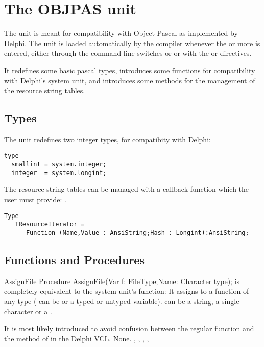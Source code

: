 \chapter{The OBJPAS unit}
The  unit is meant for compatibility with Object Pascal as
implemented by Delphi. The unit is loaded automatically by the \fpc compiler
whenever the  or  more is entered, either through
the command line switches  or  or with the  or  directives.

It redefines some basic pascal types, introduces some functions for
compatibility with Delphi's system unit, and introduces some methods for the
management of the resource string tables.

\section{Types}
The  unit redefines two integer types, for compatibity with
Delphi:
\begin{verbatim}
type
  smallint = system.integer;
  integer  = system.longint;
\end{verbatim}
The resource string tables can be managed with a callback function which the
user must provide: .
\begin{verbatim}
Type
   TResourceIterator =
      Function (Name,Value : AnsiString;Hash : Longint):AnsiString;
\end{verbatim}

\section{Functions and Procedures}

\begin{procedure}{AssignFile}
\Declaration
Procedure AssignFile(Var f: FileType;Name: Character type);
\Description
{} is completely equivalent to the system unit's 
function: It assigns  to a function of any type (
can be  or a typed or untyped  variable).  can
be a string, a single character or a .

It is most likely introduced to avoid confusion between the regular
 function and the  method of 
in the Delphi VCL.
\Errors
None.
\SeeAlso
{}, , , , 
\end{procedure}

